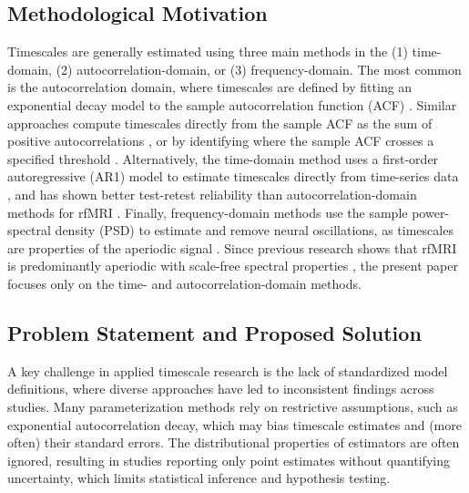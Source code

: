 \documentclass[latex/main.tex]{subfiles}
\begin{document}
\subsection{Methodological Motivation}
Timescales are generally estimated using three main methods in the (1) time-domain, (2) autocorrelation-domain, or (3) frequency-domain. The most common is the autocorrelation domain, where timescales are defined by fitting an exponential decay model to the sample autocorrelation function (ACF) \citep{rossi-pool_invariant_2021, cirillo_neural_2018, ito_cortical_2020, runyan_distinct_2017, zeraati_flexible_2022, nougaret_intrinsic_2021, wasmuht_intrinsic_2018, muller_core_2020, maisson_choice-relevant_2021, li_hierarchical_2022, shafiei_topographic_2020}. Similar approaches compute timescales directly from the sample ACF as the sum of positive autocorrelations \citep{wengler_distinct_2020, manea_intrinsic_2022, watanabe_atypical_2019}, or by identifying where the sample ACF crosses a specified threshold \citep{wengler_distinct_2020, zilio_are_2021}. Alternatively, the time-domain method uses a first-order autoregressive (AR1) model to estimate timescales directly from time-series data \citep{kaneoke_variance_2012, meisel_decline_2017, huang_timescales_2018, lurie_cortical_2024, shinn_functional_2023, shafiei_topographic_2020}, and has shown better test-retest reliability than autocorrelation-domain methods for rfMRI \citep{huang_timescales_2018}. Finally, frequency-domain methods use the sample power-spectral density (PSD) to estimate and remove neural oscillations, as timescales are properties of the aperiodic signal \citep{donoghue_parameterizing_2020, gao_neuronal_2020, manea_neural_2024, zeraati_flexible_2022, fallon_timescales_2020}. Since previous research shows that rfMRI is predominantly aperiodic with scale-free spectral properties \citep{he_temporal_2010, he_scale-free_2011}, the present paper focuses only on the time- and autocorrelation-domain methods.

\subsection{Problem Statement and Proposed Solution}
A key challenge in applied timescale research is the lack of standardized model definitions, where diverse approaches have led to inconsistent findings across studies. Many parameterization methods rely on restrictive assumptions, such as exponential autocorrelation decay, which may bias timescale estimates and (more often) their standard errors. The distributional properties of estimators are often ignored, resulting in studies reporting only point estimates without quantifying uncertainty, which limits statistical inference and hypothesis testing.\\
\end{document}
